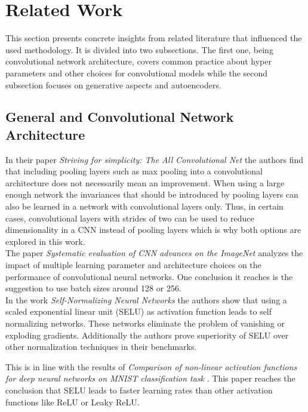 \section{Related Work}

This section presents concrete insights from related literature that influenced the used methodology. It is 
divided into two subsections. The first one, being convolutional network architecture, covers common practice about
hyper parameters and other choices for convolutional models while the second subsection focuses on generative aspects
and autoencoders.

\subsection{General and Convolutional Network Architecture} \label{related_work_general_architecture}

In their paper \textit{Striving for simplicity: The All Convolutional Net} \parencite{2015-springenberg-striving}
the authors find that including pooling layers such as max pooling into a convolutional architecture does not 
necessarily mean an improvement. When using a large enough network the invariances that should be
introduced by pooling layers can also be learned in a network with convolutional layers only. Thus, in certain cases,
convolutional layers with strides of two can be used to reduce dimensionality in a CNN instead of pooling layers
which is why both options are explored in this work.
\\

The paper \textit{Systematic evaluation of CNN advances on the ImageNet} \parencite{2016-mishkin-systematic} analyzes
the impact of multiple learning parameter and architecture choices on the performance of convolutional neural networks.
One conclusion it reaches is the suggestion to use batch sizes around 128 or 256.\\

In the work \textit{Self-Normalizing Neural Networks} \parencite{2017-klambauer-selu} the authors show that using
a scaled exponential linear unit (SELU) as activation function leads to self normalizing networks. These networks 
eliminate the problem of vanishing or exploding gradients. Additionally the authors prove superiority of SELU 
over other normalization techniques in their benchmarks. 

This is in line with the results of \textit{Comparison of non-linear activation functions for deep neural networks on
MNIST classification task} \parencite{2018-Pedamonti-comparison}. This paper reaches the conclusion that SELU leads
to faster learning rates than other activation functions like ReLU or Leaky ReLU.

